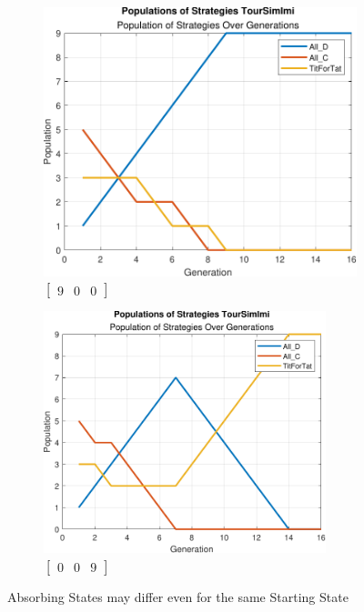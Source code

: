 \documentclass[12pt]{article}
\begin{document}
	\begin{figure}[h]
		\centering
		\begin{subfigure}{.5\textwidth}
			\centering
	      	\includegraphics[width=.9\textwidth]{900.pdf}
			\caption{$\begin{bmatrix}9&0&0\end{bmatrix}$}
	      	\label{fig:900}
		\end{subfigure}%
		\begin{subfigure}{.5\textwidth}
			\centering
	      	\includegraphics[width=0.90\textwidth]{009.pdf}
			\caption{$\begin{bmatrix}0&0&9\end{bmatrix}$}
	      	\label{fig:009}
		\end{subfigure}
		\caption{Absorbing States may differ even for the same Starting State}
		\label{fig:TourSimImi153}
	\end{figure}
\end{document}
